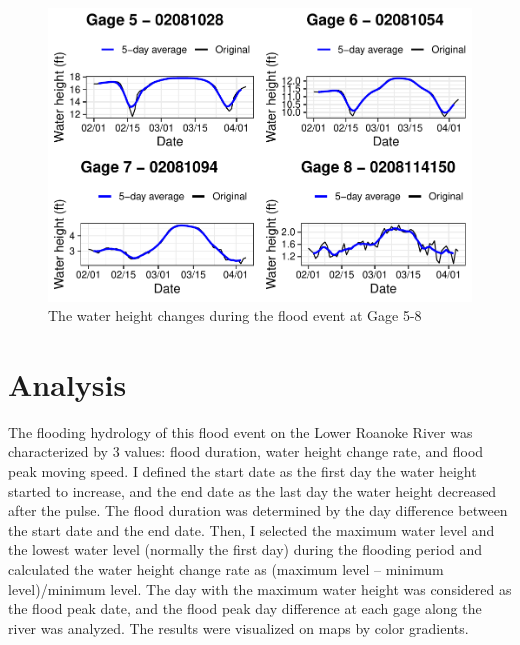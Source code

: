 \documentclass[12pt,]{article}
\begin{document}
\begin{figure}
\centering
\includegraphics{Zeng_WDA_Project_files/figure-latex/Figure 2.2-1.pdf}
\caption{The water height changes during the flood event at Gage 5-8}
\end{figure}

\newpage

\section{Analysis}\label{analysis}

The flooding hydrology of this flood event on the Lower Roanoke River
was characterized by 3 values: flood duration, water height change rate,
and flood peak moving speed. I defined the start date as the first day
the water height started to increase, and the end date as the last day
the water height decreased after the pulse. The flood duration was
determined by the day difference between the start date and the end
date. Then, I selected the maximum water level and the lowest water
level (normally the first day) during the flooding period and calculated
the water height change rate as (maximum level -- minimum level)/minimum
level. The day with the maximum water height was considered as the flood
peak date, and the flood peak day difference at each gage along the
river was analyzed. The results were visualized on maps by color
gradients.
\end{document}
